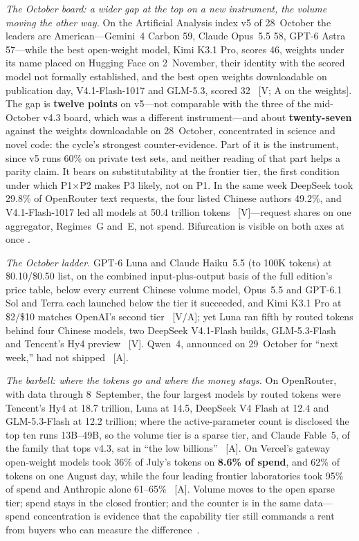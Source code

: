 \emph{The October board: a wider gap at the top on a new instrument, the volume moving the other way.} On the Artificial Analysis index v5 of 28~October the leaders are American---Gemini~4 Carbon 59, Claude Opus~5.5 58, GPT-6 Astra 57---while the best open-weight model, Kimi K3.1 Pro, scores 46, weights under its name placed on Hugging Face on 2~November, their identity with the scored model not formally established, and the best open weights downloadable on publication day, V4.1-Flash-1017 and GLM-5.3, scored 32~\cite{mdl-aa-v5,mdl-kimi-k31,lit-k31-weights} [V; A on the weights]. The gap is \textbf{twelve points} on v5---not comparable with the three of the mid-October v4.3 board, which was a different instrument---and about \textbf{twenty-seven} against the weights downloadable on 28~October, concentrated in science and novel code: the cycle's strongest counter-evidence. Part of it is the instrument, since v5 runs 60\% on private test sets, and neither reading of that part helps a parity claim. It bears on substitutability at the frontier tier, the first condition under which P1$\times$P2 makes P3 likely, not on P1. In the same week DeepSeek took 29.8\% of OpenRouter text requests, the four listed Chinese authors 49.2\%, and V4.1-Flash-1017 led all models at 50.4 trillion tokens~\cite{mdl-openrouter-oct26} [V]---request shares on one aggregator, Regimes~G and~E, not spend. Bifurcation is visible on both axes at once .

\emph{The October ladder.} GPT-6 Luna and Claude Haiku~5.5 (to 100K tokens) at \$0.10/\$0.50 list, on the combined input-plus-output basis of the full edition's price table, below every current Chinese volume model, Opus~5.5 and GPT-6.1 Sol and Terra each launched below the tier it succeeded, and Kimi K3.1 Pro at \$2/\$10 matches OpenAI's second tier~\cite{mdl-openai-ladder,mdl-opus55,mdl-gpt61-sol,mdl-gpt61-terra,mdl-kimi-k31} [V/A]; yet Luna ran fifth by routed tokens behind four Chinese models, two DeepSeek V4.1-Flash builds, GLM-5.3-Flash and Tencent's Hy4 preview~\cite{mdl-openrouter-oct26} [V]. Qwen~4, announced on 29~October for ``next week,'' had not shipped~\cite{mdl-qwen4-tease} [A].

\emph{The barbell: where the tokens go and where the money stays.} On OpenRouter, with data through 8~September, the four largest models by routed tokens were Tencent's Hy4 at 18.7 trillion, Luna at 14.5, DeepSeek V4 Flash at 12.4 and GLM-5.3-Flash at 12.2 trillion; where the active-parameter count is disclosed the top ten runs 13B--49B, so the volume tier is a sparse tier, and Claude Fable~5, of the family that tops v4.3, sat in ``the low billions''~\cite{openrouter-sep26} [A]. On Vercel's gateway open-weight models took 36\% of July's tokens on \textbf{8.6\% of spend}, and 62\% of tokens on one August day, while the four leading frontier laboratories took 95\% of spend and Anthropic alone 61--65\%~\cite{vercel-aug26} [A]. Volume moves to the open sparse tier; spend stays in the closed frontier; and the counter is in the same data---spend concentration is evidence that the capability tier still commands a rent from buyers who can measure the difference~\cite{slm-belcak}.

